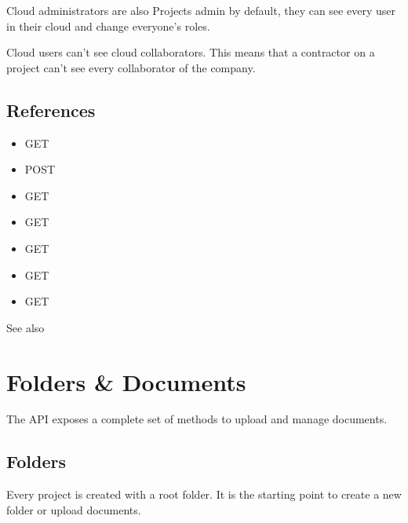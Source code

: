 \documentclass[a4paper,12pt,english]{sphinxmanual}
\begin{document}
Cloud administrators are also Projects admin by default, they can see every user in their cloud and change everyone’s roles.

Cloud users can’t see cloud collaborators. This means that a contractor on a project can’t see every collaborator of the company.


\subsection{References}
\label{\detokenize{concepts/cloud:references}}\begin{itemize}
\item {} 
GET 

\item {} 
POST 

\item {} 
GET 

\item {} 
GET 

\item {} 
GET 

\item {} 
GET 

\item {} 
GET 

\end{itemize}




See also {\hyperref[\detokenize{tutorials/guided_tour:api-onboarding-cloud}]{}}




\section{Folders \& Documents}
\label{\detokenize{concepts/folders_and_documents:folders-documents}}\label{\detokenize{concepts/folders_and_documents::doc}}
The API exposes a complete set of methods to upload and manage documents.


\subsection{Folders}
\label{\detokenize{concepts/folders_and_documents:folders}}
Every project is created with a root folder. It is the starting point to create a new folder or upload documents.
\end{document}
